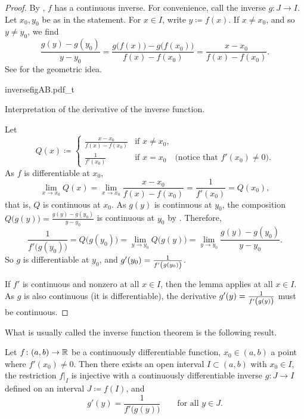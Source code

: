 \begin{proof}
By , $f$ has a continuous inverse.  For convenience,
call the inverse $g \colon J \to I$.
Let $x_0,y_0$ be as in the statement.  For $x \in I$, write $y \coloneqq f(x)$.
If $x \not= x_0$, and so $y \not= y_0$, we find
\begin{equation*}
\frac{g(y)-g(y_0)}{y-y_0} =
\frac{g\bigl(f(x)\bigr)-g\bigl(f(x_0)\bigr)}{f(x)-f(x_0)} =
\frac{x-x_0}{f(x)-f(x_0)} .
\end{equation*}
See  for the geometric idea.
\begin{myfigureht}
{inversefigAB.pdf_t}
\caption{Interpretation of the derivative of the inverse
function.\label{inversefig}}
\end{myfigureht}

Let
\begin{equation*}
Q(x) \coloneqq
\begin{cases}
\frac{x-x_0}{f(x)-f(x_0)} & \text{if } x \neq x_0, \\
\frac{1}{f'(x_0)}         & \text{if } x = x_0 \quad \text{(notice that }
f'(x_0) \neq 0 \text{)}.
\end{cases}
\end{equation*}
As $f$ is differentiable at $x_0$, 
\begin{equation*}
\lim_{x \to x_0} Q(x) =
\lim_{x \to x_0} 
\frac{x-x_0}{f(x)-f(x_0)} 
=
\frac{1}{f'(x_0)}
=
Q(x_0) ,
\end{equation*}
that is, $Q$ is continuous at $x_0$.
As $g(y)$ is continuous at $y_0$,
the composition $Q\bigl(g(y)\bigr) = \frac{g(y)-g(y_0)}{y-y_0}$
is continuous at $y_0$ by
.
Therefore,
\begin{equation*}
\frac{1}{f'\bigl(g(y_0)\bigr)}
= Q\bigl(g(y_0)\bigr)
= \lim_{y \to y_0} Q\bigl(g(y)\bigr)
= \lim_{y \to y_0} \frac{g(y)-g(y_0)}{y-y_0} .
\end{equation*}
So $g$ is differentiable at $y_0$, and $g'(y_0) =
\frac{1}{f'\left(\vphantom{1^1_1}g(y_0)\right)}$.

If $f'$ is continuous and nonzero at all $x \in I$,
then the lemma applies at all $x \in I$.  As $g$ is also
continuous (it is differentiable), the derivative $g'(y) =
\frac{1}{f'\left(\vphantom{1^1_1}g(y)\right)}$ must be continuous.
\end{proof}

What is usually called the inverse function theorem is the following result.

\begin{thm}
Let $f \colon (a,b) \to {\mathbb{R}}$ be a continuously differentiable function,
$x_0 \in (a,b)$ a point where $f'(x_0) \not= 0$.  Then there exists
an open interval $I \subset (a,b)$ with $x_0 \in I$, the
restriction $f|_{I}$ is injective with a continuously differentiable inverse
$g \colon J \to I$ defined on an interval $J \coloneqq f(I)$,
and
\begin{equation*}
g'(y) = \frac{1}{f'\bigl( g(y) \bigr)} \qquad \text{for all } y \in J.
\end{equation*}
\end{thm}

